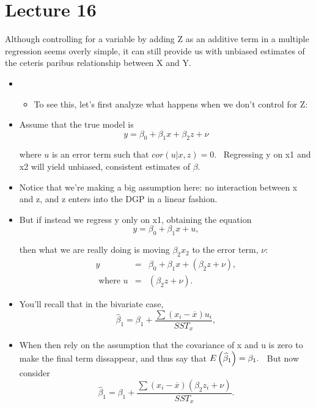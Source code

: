 \documentclass[11pt]{article}
\begin{document}
\section{Lecture 16}

Although controlling for a variable by adding Z as an additive term in a
multiple regression seems overly simple, it can still provide us with
unbiased estimates of the ceteris paribus relationship between X and Y.

\begin{itemize}
\item 
\begin{itemize}
\item To see this, let's first analyze what happens when we don't control
for Z:
\end{itemize}

\item Assume that the true model is%
\begin{equation*}
y=\beta _{0}+\beta _{1}x+\beta _{2}z+\nu
\end{equation*}

where $u$ is an error term such that $cor\left( u|x,z\right) =0$. \
Regressing y on x1 and x2 will yield unbiased, consistent estimates of $%
\beta .$

\item Notice that we're making a big assumption here: no interaction between
x and z, and z enters into the DGP in a linear fashion.

\item But if instead we regress y only on x1, obtaining the equation 
\begin{equation*}
y=\beta _{0}+\beta _{1}x+u,
\end{equation*}

then what we are really doing is moving $\beta _{2}x_{2}$ to the error term, 
$\nu :$%
\begin{eqnarray*}
y &=&\beta _{0}+\beta _{1}x+(\beta _{2}z+\nu )\mathbf{,} \\
\text{ where }u &=&(\beta _{2}z+\nu ).
\end{eqnarray*}

\item You'll recall that in the bivariate case, 
\begin{equation*}
\widehat{\beta }_{1}=\beta _{1}+\frac{\sum \left( x_{i}-\overline{x}\right)
u_{i}}{SST_{x}},
\end{equation*}

\item When then rely on the assumption that the covariance of x and u is
zero to make the final term dissappear, and thus say that $E\left( \widehat{%
\beta }_{1}\right) =\beta _{1}.$ \ But now consider%
\begin{equation*}
\widehat{\beta }_{1}=\beta _{1}+\frac{\sum \left( x_{i}-\overline{x}\right)
\left( \beta _{2}z_{i}+\nu \right) }{SST_{x}}.
\end{equation*}


\end{itemize}
\end{document}
